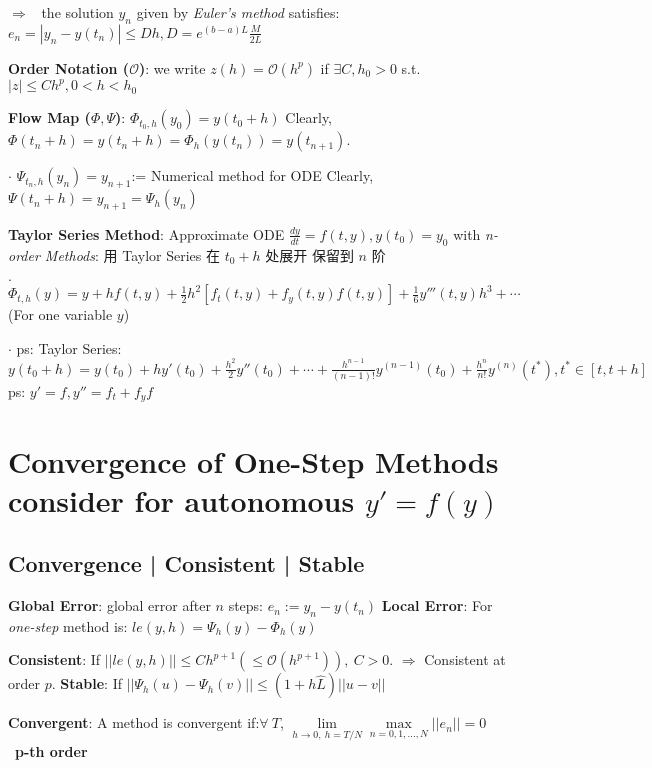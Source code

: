 \documentclass[9pt]{article}
\begin{document}
\qquad $\Rightarrow$ \ the solution $y_n$ given by \textit{Euler's method} satisfies: $e_n=|y_n-y(t_n)|\leq Dh,D=e^{(b-a)L}\frac{M}{2L}$

\textbf{Order Notation ($\mathcal{O}$)}: we write $z(h)=\mathcal{O}(h^p)$ if $\exists C,h_0>0$ s.t. $|z|\leq Ch^p,0<h<h_0$

\textbf{Flow Map ($\Phi,\Psi$)}: $\Phi_{t_0,h}(y_0)=y(t_0+h)$ \quad Clearly, $\Phi(t_n+h)=y(t_n+h)=\Phi_h(y(t_n))=y(t_{n+1})$.

\quad $\cdot$ $\Psi_{t_n,h}(y_n)=y_{n+1}$:= Numerical method for ODE \quad Clearly, $\Psi(t_n+h)=y_{n+1}=\Psi_h(y_{n})$

\textbf{Taylor Series Method}: {\small Approximate ODE $\frac{dy}{dt}=f(t,y),y(t_0)=y_0$ with \textit{n-order Methods}: 用 Taylor Series 在 $t_0+h$ 处展开 保留到 $n$ 阶}

\quad $\cdot$ $\Phi_{t,h}(y)=y+hf(t,y)+\frac{1}{2}h^2[f_t(t,y)+f_y(t,y)f(t,y)]+\frac{1}{6}y'''(t,y)h^3+\cdots$ \qquad (For one variable $y$)

\quad $\cdot$ ps: {\footnotesize Taylor Series: $y(t_0+h)=y(t_0)+hy'(t_0)+\frac{h^2}{2}y''(t_0)+\cdots+\frac{h^{n-1}}{(n-1)!}y^{(n-1)}(t_0)+\frac{h^n}{n!}y^{(n)}(t^*),t^*\in[t,t+h]$ \quad \quad  ps: $y'=f,y''=f_t+f_yf$}


\section{Convergence of One-Step Methods {\scriptsize consider for autonomous $y'=f(y)$}} %

\subsection{Convergence | Consistent | Stable} %
\textbf{Global Error}: global error after $n$ steps: $e_n:=y_n-y(t_n)$ \quad \textbf{Local Error}: {\small For \textit{one-step} method is: $le(y,h)=\Psi_h(y)-\Phi_h(y)$}

\textbf{Consistent}: {\small If $||le(y,h)||\leq Ch^{p+1} (\leq \mathcal{O}(h^{p+1})), \ C>0$. $\Rightarrow$ Consistent at order $p$.} \quad \textbf{Stable}: If $||\Psi_h(u)-\Psi_h(v)||\leq(1+h\widehat{L})||u-v||$

\textbf{Convergent}: {\small A method is convergent if:$\forall \ T$, $\lim\limits_{h\to0,\ h=T/N}\max\limits_{n=0,1,...,N}||e_n||=0$} \quad \quad {} \ {\tiny \textbf{p-th order}}
\end{document}
